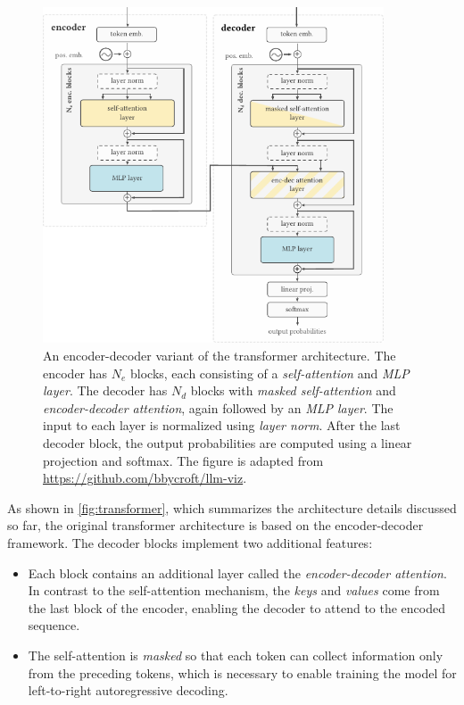 {\begin{figure}[ht]
    \centering
    \includegraphics[width=0.9\textwidth]{img/transformer.pdf}
    \caption[The transformer architecture.]{An encoder-decoder variant of the transformer architecture. The encoder has $N_{e}$ blocks, each consisting of a \emph{self-attention} and \emph{MLP layer}. The decoder has $N_{d}$ blocks with \emph{masked self-attention} and \emph{encoder-decoder attention}, again followed by an \emph{MLP layer}. The input to each layer is normalized using \emph{layer norm}. After the last decoder block, the output probabilities are computed using a linear projection and softmax. The figure is adapted from \href{https://github.com/bbycroft/llm-viz/blob/main/src/llm/intro-image.svg}{https://github.com/bbycroft/llm-viz}.}
    \label{fig:transformer}
\end{figure}



As shown in \autoref{fig:transformer}, which summarizes the architecture details discussed so far, the original transformer architecture is based on the encoder-decoder framework. The decoder blocks implement two additional features:
\begin{itemize}
    \item Each block contains an additional layer called the \emph{encoder-decoder attention}. In contrast to the self-attention mechanism, the \emph{keys} and \emph{values} come from the last block of the encoder, enabling the decoder to attend to the encoded sequence.
    \item The self-attention is \emph{masked} so that each token can collect information only from the preceding tokens, which is necessary to enable training the model for left-to-right autoregressive decoding.
\end{itemize}

}
